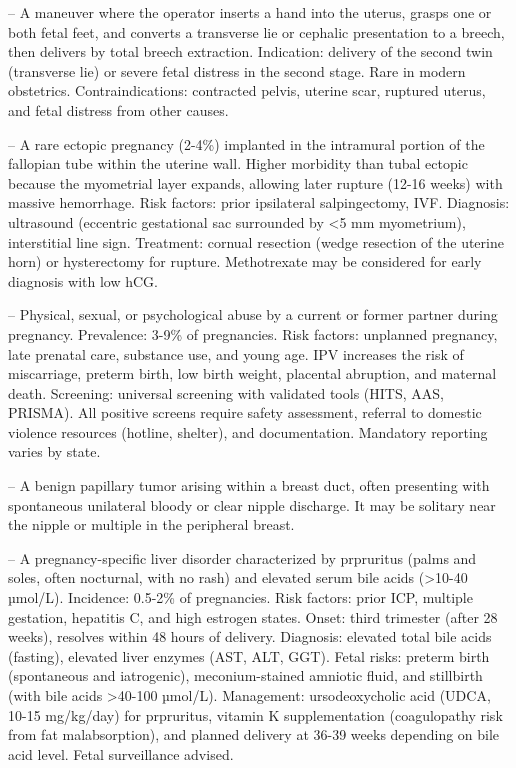 -- A maneuver where the operator inserts a hand into the uterus, grasps one or both fetal feet, and converts a transverse lie or cephalic presentation to a breech, then delivers by total breech extraction. Indication: delivery of the second twin (transverse lie) or severe fetal distress in the second stage. Rare in modern obstetrics. Contraindications: contracted pelvis, uterine scar, ruptured uterus, and fetal distress from other causes.

-- A rare ectopic pregnancy (2-4\%) implanted in the intramural portion of the fallopian tube within the uterine wall. Higher morbidity than tubal ectopic because the myometrial layer expands, allowing later rupture (12-16 weeks) with massive hemorrhage. Risk factors: prior ipsilateral salpingectomy, IVF. Diagnosis: ultrasound (eccentric gestational sac surrounded by <5 mm myometrium), interstitial line sign. Treatment: cornual resection (wedge resection of the uterine horn) or hysterectomy for rupture. Methotrexate may be considered for early diagnosis with low hCG.

-- Physical, sexual, or psychological abuse by a current or former partner during pregnancy. Prevalence: 3-9\% of pregnancies. Risk factors: unplanned pregnancy, late prenatal care, substance use, and young age. IPV increases the risk of miscarriage, preterm birth, low birth weight, placental abruption, and maternal death. Screening: universal screening with validated tools (HITS, AAS, PRISMA). All positive screens require safety assessment, referral to domestic violence resources (hotline, shelter), and documentation. Mandatory reporting varies by state.

-- A benign papillary tumor arising within a breast duct, often presenting with spontaneous unilateral bloody or clear nipple discharge. It may be solitary near the nipple or multiple in the peripheral breast.

-- A pregnancy-specific liver disorder characterized by prpruritus (palms and soles, often nocturnal, with no rash) and elevated serum bile acids (>10-40 µmol/L). Incidence: 0.5-2\% of pregnancies. Risk factors: prior ICP, multiple gestation, hepatitis C, and high estrogen states. Onset: third trimester (after 28 weeks), resolves within 48 hours of delivery. Diagnosis: elevated total bile acids (fasting), elevated liver enzymes (AST, ALT, GGT). Fetal risks: preterm birth (spontaneous and iatrogenic), meconium-stained amniotic fluid, and stillbirth (with bile acids >40-100 µmol/L). Management: ursodeoxycholic acid (UDCA, 10-15 mg/kg/day) for prpruritus, vitamin K supplementation (coagulopathy risk from fat malabsorption), and planned delivery at 36-39 weeks depending on bile acid level. Fetal surveillance advised.

